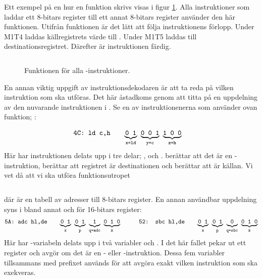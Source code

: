 \documentclass[main.tex]{subfiles}
\begin{document}
Ett exempel på en hur en funktion skrivs visas i figur \ref{fig:ld}. Alla
instruktioner som laddar ett 8-bitars register till ett annat 8-bitars register
använder den här funktionen. Utifrån funktionen är det lätt att följa
instruktionens förlopp. Under M1T4 laddas källregistrets värde till .
Under M1T5 laddas  till destinationsregistret. Därefter är
instruktionen färdig.
\begin{figure}
    \inputminted{vhdl}{lst/vhdl_instr.vhd}
    \caption{Funktionen för alla -instruktioner.}
    \label{fig:ld}
\end{figure}

En annan viktig uppgift av instruktionsdekodaren är att ta reda på vilken
instruktion som ska utföras. Det här åstadkoms genom att titta på en uppdelning
av den nuvarande instruktionen i . Se en av instruktionenerna som
använder ovan funktion; :

\begin{align*}
    &\texttt{4C: ld c,h}& \quad &
    {\underbrace{\texttt{0 1}}_{\texttt{x=ld}}}\texttt{ }
    {\underbrace{\texttt{0 0 1}}_{\texttt{y=c}}}\texttt{ }
    {\underbrace{\texttt{1 0 0}}_{\texttt{z=h}}}
\end{align*}
Här har instruktionen delats upp i tre delar; ,  och .
 berättar att det är en -instruktion,  berättar
att registret  är destinationen och  berättar att  är
källan. Vi vet då att vi ska utföra funktionsutropet
\begin{center}
    \inputminted{vhdl}{lst/vhdl_ld.vhd}
\end{center}
där  är en tabell av adresser till 8-bitars register. En annan
användbar uppdelning syns i bland annat  och  för 16-bitars
register:
\begin{align*}
    &\texttt{5A: adc hl,de}& \quad &
    {\underbrace{\texttt{0 1}}_{\texttt{x}}}\texttt{ }
    {\underbrace{\texttt{0 1}}_{\texttt{p}}}\texttt{ }
    {\underbrace{\texttt{1}}_{\texttt{q=adc}}}\texttt{ }
    {\underbrace{\texttt{0 1 0}}_{\texttt{z}}}
    \qquad
    &\texttt{52: sbc hl,de}& \quad &
    {\underbrace{\texttt{0 1}}_{\texttt{x}}}\texttt{ }
    {\underbrace{\texttt{0 1}}_{\texttt{p}}}\texttt{ }
    {\underbrace{\texttt{0}}_{\texttt{q=sbc}}}\texttt{ }
    {\underbrace{\texttt{0 1 0}}_{\texttt{z}}}
\end{align*}
Här har -variabeln delats upp i två variabler  och .  I
det här fallet pekar  ut ett register och  avgör om det är en
- eller -instruktion. Dessa fem variabler tillsammans med
prefixet används för att avgöra exakt vilken instruktion som ska exekveras.
\end{document}
